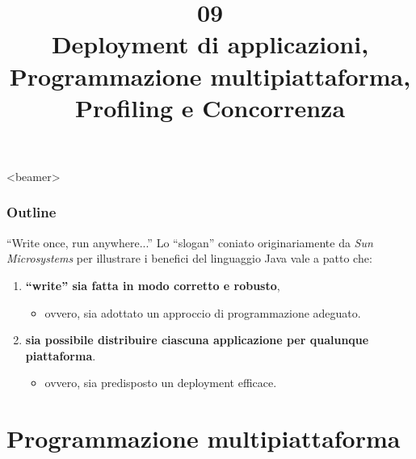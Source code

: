 \documentclass[presentation]{beamer}
\title[OOP09 -- Deployment and Concurrency]{09\\Deployment di applicazioni, Programmazione multipiattaforma, Profiling e Concorrenza}
\begin{document}
\frame[label=coverpage]{\titlepage}

\begin{frame}<beamer>
 	\frametitle{Outline}
 	\tableofcontents[]
\end{frame}

\begin{frame}{``Write once, run anywhere...''}
Lo ``slogan'' coniato originariamente da \textit{Sun Microsystems} per illustrare i benefici del linguaggio Java vale a patto che:

\begin{enumerate}\itemsep10pt
\item \textbf{``write'' sia fatta in modo corretto e robusto},
\begin{itemize}
\item ovvero, sia adottato un approccio di programmazione adeguato.
\end{itemize}
\item \textbf{sia possibile distribuire ciascuna applicazione per qualunque piattaforma}.
\begin{itemize}
\item ovvero, sia predisposto un deployment efficace. 
\end{itemize}
\end{enumerate}
\end{frame}

\section{Programmazione multipiattaforma}
\end{document}
